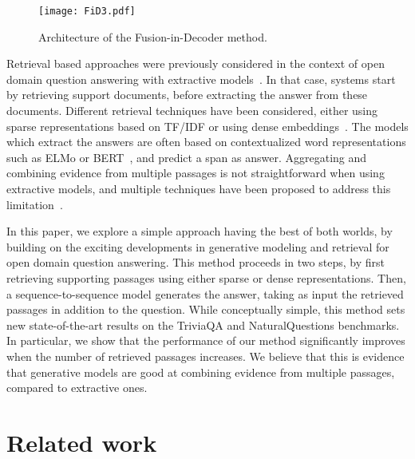 \documentclass[11pt,a4paper]{article}
\begin{document}
\begin{figure*}[h]
\begin{center} 
\texttt{[image: FiD3.pdf]}

\caption{Architecture of the Fusion-in-Decoder method.}
\label{fig:FID}
\end{center}
\end{figure*}

Retrieval based approaches were previously considered in the context of open domain question answering with extractive models~\citep{chen2017reading}.
In that case, systems start by retrieving support documents, before extracting the answer from these documents.
Different retrieval techniques have been considered, either using sparse representations based on TF/IDF or using dense embeddings~\citep{guu2020realm,karpukhin2020dense}.
The models which extract the answers are often based on contextualized word representations such as ELMo or BERT~\citep{peters2018deep,devlin2018bert}, and predict a span as answer.
Aggregating and combining evidence from multiple passages is not straightforward when using extractive models, and multiple techniques have been proposed to address this limitation~\citep{clark2017simple,min2019discrete}.

In this paper, we explore a simple approach having the best of both worlds, by building on the exciting developments in generative modeling and retrieval for open domain question answering.
This method proceeds in two steps, by first retrieving supporting passages using either sparse or dense representations.
Then, a sequence-to-sequence model generates the answer, taking as input the retrieved passages in addition to the question.
While conceptually simple, this method sets new state-of-the-art results on the TriviaQA and NaturalQuestions benchmarks.
In particular, we show that the performance of our method significantly improves when the number of retrieved passages increases.
We believe that this is evidence that generative models are good at combining evidence from multiple passages, compared to extractive ones.


\section{Related work}
\end{document}
